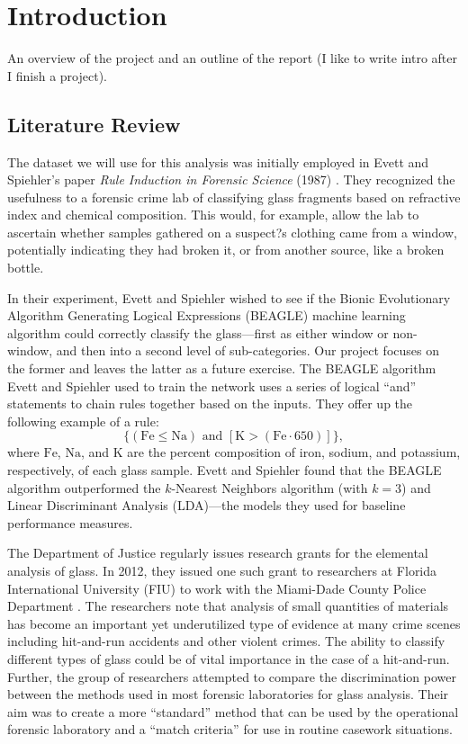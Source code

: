 \documentclass[12pt,halfline,a4paper]{ouparticle}
\begin{document}
\section{Introduction}
\label{sec2}
An overview of the project and an outline of the report (I like to write intro after I finish a project).

\subsection{Literature Review}
\label{sec2.1}
The dataset we will use for this analysis was initially employed in Evett and Spiehler's paper \emph{Rule Induction in Forensic Science} (1987) \cite{evett1987}. They recognized the usefulness to a forensic crime lab of classifying glass fragments based on refractive index and chemical composition. This would, for example, allow the lab to ascertain whether samples gathered on a suspect?s clothing came from a window, potentially indicating they had broken it, or from another source, like a broken bottle. 

In their experiment, Evett and Spiehler wished to see if the Bionic Evolutionary Algorithm Generating Logical Expressions (BEAGLE) machine learning algorithm could correctly classify the glass---first as either window or non-window, and then into a second level of sub-categories. Our project focuses on the former and leaves the latter as a future exercise. The BEAGLE algorithm Evett and Spiehler used to train the network uses a series of logical ``and'' statements to chain rules together based on the inputs. They offer up the following example of a rule: 
\[ 
\{(\mathrm{Fe} \leq \mathrm{Na}) \text{ and } [\mathrm{K} > (\mathrm{Fe} \cdot 650)]\}, 
\]
where $\mathrm{Fe}$, $\mathrm{Na}$, and $\mathrm{K}$ are the percent composition of iron, sodium, and potassium, respectively, of each glass sample. Evett and Spiehler found that the BEAGLE algorithm outperformed the $k$-Nearest Neighbors algorithm (with $ k = 3$) and Linear Discriminant Analysis (LDA)---the models they used for baseline performance measures. 

The Department of Justice regularly issues research grants for the elemental analysis of glass. In 2012, they issued one such grant to researchers at Florida International University (FIU) to work with the Miami-Dade County Police Department \cite{almirall2012}. The researchers note that analysis of small quantities of materials has become an important yet underutilized type of evidence at many crime scenes including hit-and-run accidents and other violent crimes. The ability to classify different types of glass could be of vital importance in the case of a hit-and-run. Further, the group of researchers attempted to compare the discrimination power between the methods used in most forensic laboratories for glass analysis. Their aim was to create a more ``standard'' method that can be used by the operational forensic laboratory and a ``match criteria'' for use in routine casework situations.
\end{document}
